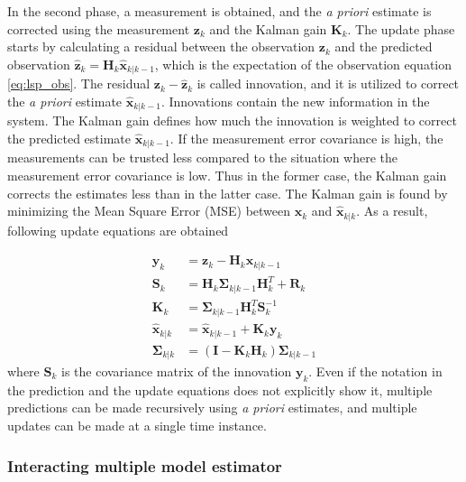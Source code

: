 \documentclass[english, 12pt, a4paper, elec, utf8, a-1b, online]{aaltothesis}
\numberwithin{equation}{section}
\renewcommand{\vec}[1]{\mathbf{#1}}
\newcommand{\inv}[1]{#1^{-1}}
\newcommand{\xprior}{\hat{\vec{x}}_{k|k-1}}
\newcommand{\xpost}{\hat{\vec{x}}_{k|k}}
\newcommand{\priorecov}{\boldsymbol{\Sigma}_{k|k-1}}
\newcommand{\postecov}{\boldsymbol{\Sigma}_{k|k}}
\newcommand{\prefitinnov}{\vec{y}_k}
\newcommand{\x}{\vec{x}_k}
\newcommand{\z}{\vec{z}_k}
\newcommand{\omodel}{\vec{H}_k}
\newcommand{\ocov}{\vec{R}_k}
\newcommand{\innocov}{\vec{S}_k}
\newcommand{\eye}{\vec{I}}
\newcommand{\gain}{\vec{K}_k}
\def\prior{\textit{a priori}}
\newcommand{\zhat}{\hat{\vec{z}}_k}
\begin{document}
In the second phase, a measurement is obtained, and the \prior{} estimate is corrected using the measurement $\z$ and the Kalman gain $\gain$.
The update phase starts by calculating a residual between the observation $\z$ and the predicted observation $\zhat = \omodel \xprior$, which is the expectation of the observation equation \eqref{eq:lsp_obs}.
The residual $\z-\zhat$ is called innovation, and it is utilized to correct the \prior{} estimate $\xprior$.
Innovations contain the new information in the system.
The Kalman gain defines how much the innovation is weighted to correct the predicted estimate $\xprior$.
If the measurement error covariance is high, the measurements can be trusted less compared to the situation where the measurement error covariance is low.
Thus in the former case, the Kalman gain corrects the estimates less than in the latter case.
The Kalman gain is found by minimizing the Mean Square Error (MSE) between $\x$ and $\xpost$.
As a result, following update equations are obtained \cite{Zarchan2000}

\begin{align}
    \prefitinnov &= \z - \omodel \xprior \label{eq:kf_prefit_innov}\\ 
    \innocov &= \omodel \priorecov \omodel^T + \ocov \label{eq:kf_innov_cov}\\ 
    \gain &= \priorecov \omodel^T \inv{\innocov} \label{eq:kf_gain}\\ 
    \xpost &= \xprior + \gain \prefitinnov \label{eq:kf_update_x}\\ 
    \postecov &= \left( \eye - \gain \omodel \right) \priorecov  \label{eq:kf_post_error_cov}
\end{align}
where $\innocov$ is the covariance matrix of the innovation $\prefitinnov$. 
Even if the notation in the prediction and the update equations does not explicitly show it, multiple predictions can be made recursively using \prior{} estimates, and multiple updates can be made at a single time instance.

\subsubsection{Interacting multiple model estimator}
\label{sec:IMM}
\end{document}
